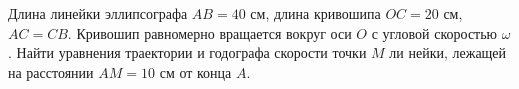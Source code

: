 Длина линейки эллипсографа $AB=40$ см, длина кривошипа $OC=20$ см, $AC=
CB$. Кривошип равномерно вращается вокруг оси $O$ с угловой скоростью
$\omega$. Найти уравнения траектории и годографа скорости точки $M$ ли
нейки, лежащей на расстоянии $AM=10$ см от конца $A$.
